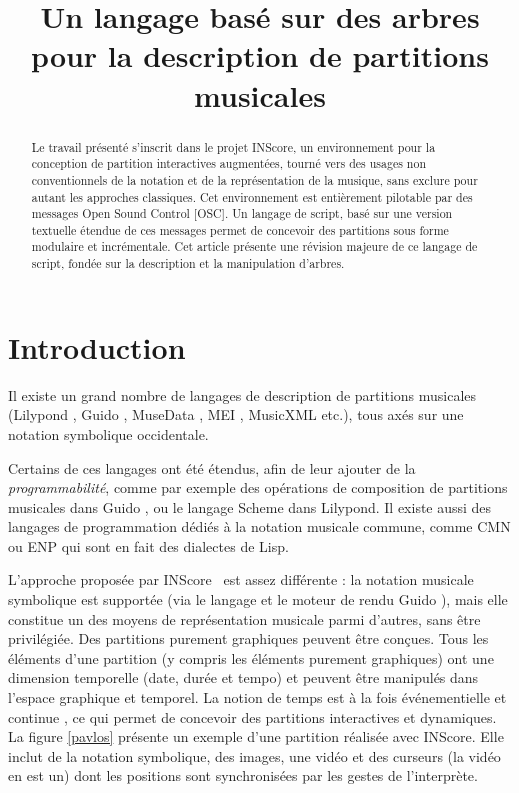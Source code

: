 \documentclass{article}
\title{Un langage basé sur des arbres pour la description de partitions musicales}
\newcommand{\IS}		{INScore}
\begin{document}
%
\maketitle
%
\begin{abstract}
Le travail présenté s'inscrit dans le projet \IS, un environnement pour la conception de partition interactives augmentées, tourné vers des usages non conventionnels de la notation et de la représentation de la musique, sans exclure pour autant les approches classiques. Cet environnement est entièrement pilotable par des messages Open Sound Control [OSC]. Un langage de script, basé sur une version textuelle étendue de ces messages permet de concevoir des partitions sous forme modulaire et incrémentale. Cet article présente une révision majeure de ce langage de script, fondée sur la description et la manipulation d'arbres.
\end{abstract}

\section{Introduction}\label{sec:introduction}

Il existe un grand nombre de langages de description de partitions musicales (Lilypond \cite{lilypond03}, Guido \cite{hoos98}, MuseData \cite{Hewlett97}, MEI \cite{Roland_2002}, MusicXML \cite{good01} etc.), tous axés sur une notation symbolique occidentale.
 
Certains de ces langages ont été étendus, afin de leur ajouter de la \textit{programmabilité}, comme par exemple des opérations de composition de partitions musicales dans Guido \cite{fober12b}, ou le langage Scheme dans Lilypond.
Il existe aussi des langages de programmation dédiés à la notation musicale commune, comme CMN \cite{Schottstaedt97} ou ENP 
qui sont en fait des dialectes de Lisp.

L'approche proposée par \IS\ \cite{Fober:12a} est assez différente : la notation musicale symbolique est supportée (via le langage et le moteur de rendu Guido \cite{Dau:09b,hoos98}), mais elle constitue un des moyens de représentation musicale parmi d'autres, sans être privilégiée. 
Des partitions purement graphiques peuvent être conçues. Tous les éléments d'une partition (y compris les éléments purement graphiques) ont une dimension temporelle (date, durée et tempo) et peuvent être manipulés dans l'espace graphique et temporel. La notion de temps est à la fois événementielle et continue \cite{fober17c}, ce qui permet de concevoir des partitions interactives et dynamiques. La figure \ref{pavlos} présente un exemple d'une partition réalisée avec \IS . Elle inclut de la notation symbolique, des images, une vidéo et des curseurs (la vidéo en est un) dont les positions sont synchronisées par les gestes de l'interprète.
\end{document}
